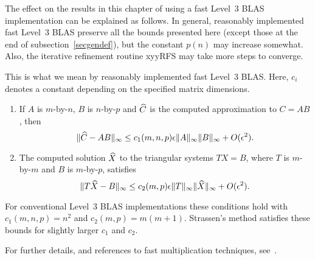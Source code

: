 The effect on the results in this chapter of using a fast Level~3 BLAS
implementation can be explained as follows. In general, reasonably
implemented fast Level~3 BLAS preserve all the bounds presented here
(except those at the end of subsection~\ref{secgendef}), but the constant
$p(n)$ may increase somewhat. Also, the iterative refinement
routine
xyyRFS may take more steps to converge.

This is what we mean by reasonably implemented fast Level~3 BLAS.
Here, $c_i$ denotes a constant depending on the specified matrix dimensions.

\begin{enumerate}

\item If $A$ is $m$-by-$n$, $B$ is $n$-by-$p$ and $\widehat C$ is the computed
approximation to $C=AB$, then
$$
    \| \widehat C - AB \|_{\infty} \le c_1(m,n,p) \epsilon \|A\|_{\infty}\|B\|_{\infty} + O(\epsilon^2).
$$

\item The computed solution $\widehat X$ to the triangular systems $TX=B$,
where $T$ is $m$-by-$m$ and $B$ is $m$-by-$p$, satisfies
$$
    \| T \widehat X - B \|_{\infty} \le c_2(m,p) \epsilon \|T\|_{\infty} \|\widehat X\|_{\infty}
        + O(\epsilon^2).
$$

\end{enumerate}

For conventional Level~3 BLAS implementations these conditions
hold with $c_1(m,n,p) = n^2$ and $c_2(m,p)= m(m+1)$.
Strassen's method satisfies these
bounds for slightly larger $c_1$ and $c_2$.

For further details, and references to fast multiplication techniques,
see~\cite{Demmel-Higham-Wnote22}.

